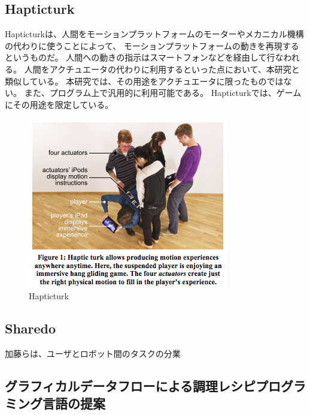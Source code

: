 \subsection{Hapticturk}\label{hapticturk}

Hapticturk\cite{hapticturk}は、人間をモーションプラットフォームのモーターやメカニカル機構の代わりに使うことによって、
モーションプラットフォームの動きを再現するというものだ。
人間への動きの指示はスマートフォンなどを経由して行なわれる。
人間をアクチュエータの代わりに利用するといった点において、本研究と類似している。
本研究では、その用途をアクチュエータに限ったものではない。
また、プログラム上で汎用的に利用可能である。
Hapticturkでは、ゲームにその用途を限定している。

\begin{figure}[htbp]
  \begin{center}
  \includegraphics[width=.6\linewidth,bb=0 0 332 281]{images/hapticturk.png}
  \end{center}
  \caption{Hapticturk}
  \label{fig:hapticturk}
\end{figure}

\subsection{Sharedo}\label{sharedo}

加藤らは、ユーザとロボット間のタスクの分業

\cite{sharedo}

\subsection{グラフィカルデータフローによる調理レシピプログラミング言語の提案}\label{ux30b0ux30e9ux30d5ux30a3ux30abux30ebux30c7ux30fcux30bfux30d5ux30edux30fcux306bux3088ux308bux8abfux7406ux30ecux30b7ux30d4ux30d7ux30edux30b0ux30e9ux30dfux30f3ux30b0ux8a00ux8a9eux306eux63d0ux6848}

